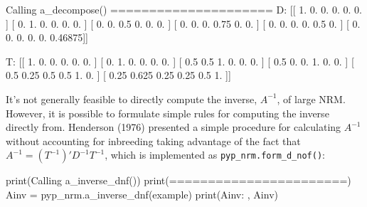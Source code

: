 \documentclass[
  letterpaper,
  DIV=11,
  numbers=noendperiod]{scrreprt}
\newenvironment{Shaded}{\begin{snugshade}}{\end{snugshade}}
\newcommand{\BuiltInTok}[1]{\textcolor[rgb]{0.00,0.23,0.31}{#1}}
\newcommand{\FloatTok}[1]{\textcolor[rgb]{0.68,0.00,0.00}{#1}}
\newcommand{\NormalTok}[1]{\textcolor[rgb]{0.00,0.23,0.31}{#1}}
\newcommand{\OperatorTok}[1]{\textcolor[rgb]{0.37,0.37,0.37}{#1}}
\newcommand{\StringTok}[1]{\textcolor[rgb]{0.13,0.47,0.30}{#1}}
\begin{document}
\begin{Shaded}
\begin{Highlighting}[]
\NormalTok{Calling a\_decompose()}
\OperatorTok{=====================}
\NormalTok{D:  [[ }\FloatTok{1.}       \FloatTok{0.}       \FloatTok{0.}       \FloatTok{0.}       \FloatTok{0.}       \FloatTok{0.}\NormalTok{     ]}
\NormalTok{ [ }\FloatTok{0.}       \FloatTok{1.}       \FloatTok{0.}       \FloatTok{0.}       \FloatTok{0.}       \FloatTok{0.}\NormalTok{     ]}
\NormalTok{ [ }\FloatTok{0.}       \FloatTok{0.}       \FloatTok{0.5}      \FloatTok{0.}       \FloatTok{0.}       \FloatTok{0.}\NormalTok{     ]}
\NormalTok{ [ }\FloatTok{0.}       \FloatTok{0.}       \FloatTok{0.}       \FloatTok{0.75}     \FloatTok{0.}       \FloatTok{0.}\NormalTok{     ]}
\NormalTok{ [ }\FloatTok{0.}       \FloatTok{0.}       \FloatTok{0.}       \FloatTok{0.}       \FloatTok{0.5}      \FloatTok{0.}\NormalTok{     ]}
\NormalTok{ [ }\FloatTok{0.}       \FloatTok{0.}       \FloatTok{0.}       \FloatTok{0.}       \FloatTok{0.}       \FloatTok{0.46875}\NormalTok{]]}

\NormalTok{T:  [[ }\FloatTok{1.}     \FloatTok{0.}     \FloatTok{0.}     \FloatTok{0.}     \FloatTok{0.}     \FloatTok{0.}\NormalTok{   ]}
\NormalTok{ [ }\FloatTok{0.}     \FloatTok{1.}     \FloatTok{0.}     \FloatTok{0.}     \FloatTok{0.}     \FloatTok{0.}\NormalTok{   ]}
\NormalTok{ [ }\FloatTok{0.5}    \FloatTok{0.5}    \FloatTok{1.}     \FloatTok{0.}     \FloatTok{0.}     \FloatTok{0.}\NormalTok{   ]}
\NormalTok{ [ }\FloatTok{0.5}    \FloatTok{0.}     \FloatTok{0.}     \FloatTok{1.}     \FloatTok{0.}     \FloatTok{0.}\NormalTok{   ]}
\NormalTok{ [ }\FloatTok{0.5}    \FloatTok{0.25}   \FloatTok{0.5}    \FloatTok{0.5}    \FloatTok{1.}     \FloatTok{0.}\NormalTok{   ]}
\NormalTok{ [ }\FloatTok{0.25}   \FloatTok{0.625}  \FloatTok{0.25}   \FloatTok{0.25}   \FloatTok{0.5}    \FloatTok{1.}\NormalTok{   ]]}
\end{Highlighting}
\end{Shaded}

It's not generally feasible to directly compute the inverse, \(A^{-1}\),
of large NRM. However, it is possible to formulate simple rules for
computing the inverse directly from. Henderson (1976) presented a simple
procedure for calculating \(A^{-1}\) without accounting for inbreeding
taking advantage of the fact that \(A^{-1}=(T^{-1})'D^{-1}T^{-1}\),
which is implemented as \texttt{pyp\_nrm.form\_d\_nof()}:

\begin{Shaded}
\begin{Highlighting}[]
\BuiltInTok{print}\NormalTok{(}\StringTok{\textquotesingle{}Calling a\_inverse\_dnf()\textquotesingle{}}\NormalTok{)}
\BuiltInTok{print}\NormalTok{(}\StringTok{\textquotesingle{}=======================\textquotesingle{}}\NormalTok{)}
\NormalTok{Ainv }\OperatorTok{=}\NormalTok{ pyp\_nrm.a\_inverse\_dnf(example)}
\BuiltInTok{print}\NormalTok{(}\StringTok{\textquotesingle{}Ainv: \textquotesingle{}}\NormalTok{, Ainv)}
\end{Highlighting}
\end{Shaded}
\end{document}

